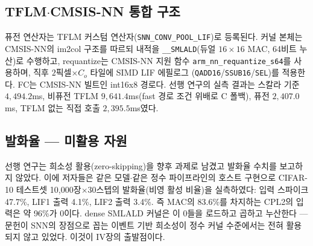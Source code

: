\subsection{TFLM$\cdot$CMSIS-NN 통합 구조}

퓨전 연산자는 TFLM 커스텀 연산자(\texttt{SNN\_CONV\_POOL\_LIF})로
등록된다. 커널 본체는 CMSIS-NN의 im2col 구조를 따르되 내적을
\texttt{\_\_SMLALD}(듀얼 $16{\times}16$ MAC, 64비트 누산)로 수행하고,
requantize는 CMSIS-NN 지원 함수 \texttt{arm\_nn\_requantize\_s64}를
사용하며, 직후 $2$픽셀$\times C_o$ 타일에 SIMD LIF 에필로그
(\texttt{QADD16}/\texttt{SSUB16}/\texttt{SEL})를 적용한다. FC는
CMSIS-NN 빌트인 int16x8 경로다. 선행 연구의 실측 결과는 스칼라 기준
$4{,}494.2$ms, 비퓨전 TFLM $9{,}641.4$ms(fast 경로 조건 위배로 C
폴백), 퓨전 $2{,}407.0$ms, TFLM 없는 직접 호출
$2{,}395.5$ms였다\cite{cha2026fusion}.

\subsection{발화율 --- 미활용 자원}\label{sec:sparsity}

선행 연구\cite{cha2026fusion}는 희소성 활용(zero-skipping)을 향후
과제로 남겼고 발화율 수치를 보고하지 않았다. 이에 저자들은 같은
모델$\cdot$같은 정수 파이프라인의 호스트 구현으로 CIFAR-10 테스트셋
10{,}000장$\times$30스텝의 발화율(비영 활성 비율)을 실측하였다:
입력 스파이크 47.7\%, LIF1 출력 4.1\%, LIF2 출력 3.4\%. 즉 MAC의
83.6\%를 차지하는 CPL2의 입력은 약 96\%가 0이다. dense SMLALD 커널은
이 0들을 로드하고 곱하고 누산한다 --- 문헌이 SNN의 장점으로 꼽는
이벤트 기반 희소성\cite{roy2019towards}이 정수 커널 수준에서는 전혀
활용되지 않고 있었다. 이것이 IV장의 출발점이다.
